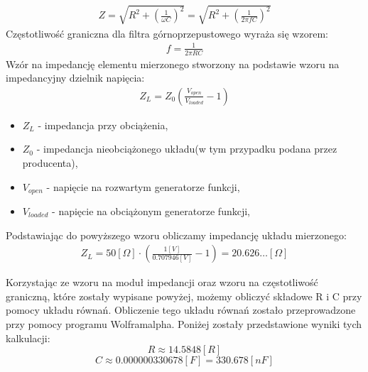 \documentclass[11pt]{article}
\begin{document}
    \begin{gather*}
        Z=\sqrt{R^2+(\frac{1}{\omega C})^2}=\sqrt{R^2+(\frac{1}{2\pi f C})^2}
    \end{gather*}
    Częstotliwość graniczna dla filtra górnoprzepustowego wyraża się wzorem:
    \begin{gather*}
        f=\frac{1}{2\pi RC}
    \end{gather*}
    Wzór na impedancję elementu mierzonego stworzony na podstawie wzoru na impedancyjny dzielnik napięcia:
    \begin{gather*}
        Z_L=Z_0(\frac{V_{open}}{V_{loaded}}-1)
    \end{gather*}
    {\footnotesize
        \begin{itemize}
            \setlength\itemsep{0em}
            \item[] \boldmath$Z_L$ - impedancja przy obciążenia,
            \item[] \boldmath$Z_0$ - impedancja nieobciążonego układu(w tym przypadku podana przez producenta),
            \item[] \boldmath$V_{open}$ - napięcie na rozwartym generatorze funkcji,
            \item[] \boldmath$V_{loaded}$ - napięcie na obciążonym generatorze funkcji,
        \end{itemize}}
    \noindent Podstawiając do powyższego wzoru obliczamy impedancję układu mierzonego:
    \begin{gather*}
        Z_L=50[\Omega]\cdot(\frac{1[V]}{0.707946[V]}-1)=20.626\dots[\Omega]
    \end{gather*}
    \par Korzystając ze wzoru na moduł impedancji oraz wzoru na częstotliwość graniczną, które zostały wypisane powyżej, możemy obliczyć składowe R i C
    przy pomocy układu równań. Obliczenie tego układu równań zostało przeprowadzone przy pomocy programu Wolframalpha. Poniżej
    zostały przedstawione wyniki tych kalkulacji:
    \begin{equation*}
        R\approx 14.5848[R]
    \end{equation*}
    \begin{equation*}
        C\approx 0.000000330678[F]=330.678[nF]
    \end{equation*}
    \newpage
\end{document}
